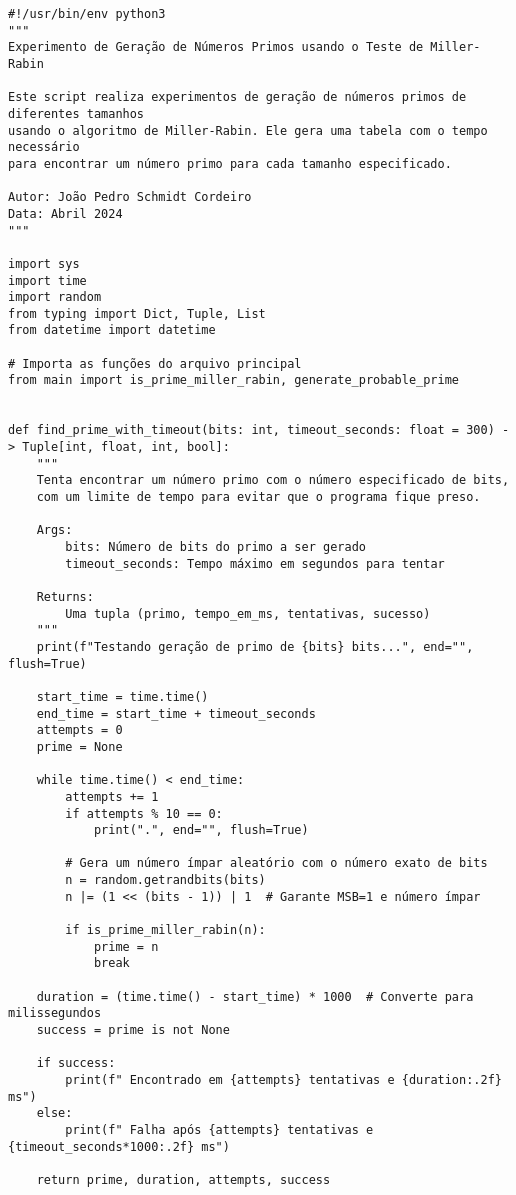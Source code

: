 \begin{verbatim}
#!/usr/bin/env python3
"""
Experimento de Geração de Números Primos usando o Teste de Miller-Rabin

Este script realiza experimentos de geração de números primos de diferentes tamanhos
usando o algoritmo de Miller-Rabin. Ele gera uma tabela com o tempo necessário 
para encontrar um número primo para cada tamanho especificado.

Autor: João Pedro Schmidt Cordeiro
Data: Abril 2024
"""

import sys
import time
import random
from typing import Dict, Tuple, List
from datetime import datetime

# Importa as funções do arquivo principal
from main import is_prime_miller_rabin, generate_probable_prime


def find_prime_with_timeout(bits: int, timeout_seconds: float = 300) -> Tuple[int, float, int, bool]:
    """
    Tenta encontrar um número primo com o número especificado de bits,
    com um limite de tempo para evitar que o programa fique preso.
    
    Args:
        bits: Número de bits do primo a ser gerado
        timeout_seconds: Tempo máximo em segundos para tentar
        
    Returns:
        Uma tupla (primo, tempo_em_ms, tentativas, sucesso)
    """
    print(f"Testando geração de primo de {bits} bits...", end="", flush=True)
    
    start_time = time.time()
    end_time = start_time + timeout_seconds
    attempts = 0
    prime = None
    
    while time.time() < end_time:
        attempts += 1
        if attempts % 10 == 0:
            print(".", end="", flush=True)
        
        # Gera um número ímpar aleatório com o número exato de bits
        n = random.getrandbits(bits)
        n |= (1 << (bits - 1)) | 1  # Garante MSB=1 e número ímpar
        
        if is_prime_miller_rabin(n):
            prime = n
            break
    
    duration = (time.time() - start_time) * 1000  # Converte para milissegundos
    success = prime is not None
    
    if success:
        print(f" Encontrado em {attempts} tentativas e {duration:.2f} ms")
    else:
        print(f" Falha após {attempts} tentativas e {timeout_seconds*1000:.2f} ms")
    
    return prime, duration, attempts, success



\end{verbatim}
